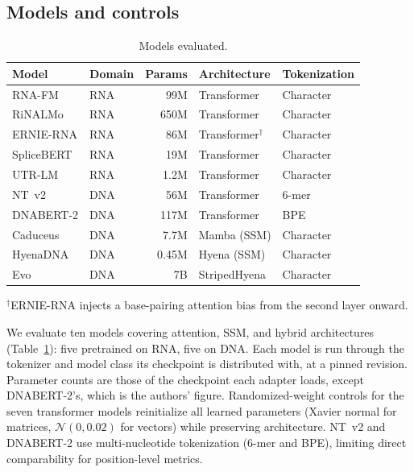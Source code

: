\documentclass[11pt]{article}
\begin{document}
\subsection{Models and controls}
\label{sec:models}

\begin{table}[htbp]
\centering
\caption{Models evaluated.}
\label{tab:models}
\begin{tabular}{@{}llrll@{}}
\toprule
\textbf{Model} & \textbf{Domain} & \textbf{Params} & \textbf{Architecture} & \textbf{Tokenization} \\
\midrule
RNA-FM \citep{rnafm}                    & RNA & 99M  & Transformer           & Character \\
RiNALMo \citep{rinalmo}                 & RNA & 650M & Transformer           & Character \\
ERNIE-RNA \citep{yin2025ernierna}        & RNA & 86M  & Transformer$^\dagger$ & Character \\
SpliceBERT \citep{chen2024splicebert}     & RNA & 19M  & Transformer           & Character \\
UTR-LM \citep{chu2024utrlm}             & RNA & 1.2M & Transformer           & Character \\
NT~v2 \citep{dalla2023nucleotide}        & DNA & 56M  & Transformer           & 6-mer     \\
DNABERT-2 \citep{zhou2024dnabert2}       & DNA & 117M & Transformer           & BPE       \\
Caduceus \citep{schiff2024caduceus}      & DNA & 7.7M & Mamba (SSM)           & Character \\
HyenaDNA \citep{nguyen2024hyenadna}      & DNA & 0.45M & Hyena (SSM)          & Character \\
Evo \citep{nguyen2024evo}                & DNA & 7B   & StripedHyena          & Character \\
\bottomrule
\end{tabular}
\medskip

\small $^\dagger$ERNIE-RNA injects a base-pairing attention bias from the
second layer onward.
\end{table}

We evaluate ten models covering attention, SSM, and hybrid architectures
(Table~\ref{tab:models}): five pretrained on RNA, five on DNA. Each model is
run through the tokenizer and model class its checkpoint is distributed with,
at a pinned revision. Parameter counts are those of the checkpoint each adapter
loads, except DNABERT-2's, which is the authors' figure.
Randomized-weight controls for the seven transformer models reinitialize all
learned parameters (Xavier normal for matrices, $\mathcal{N}(0, 0.02)$
for vectors) while preserving architecture. NT~v2 and DNABERT-2 use
multi-nucleotide tokenization (6-mer and BPE), limiting direct
comparability for position-level metrics.
\end{document}
